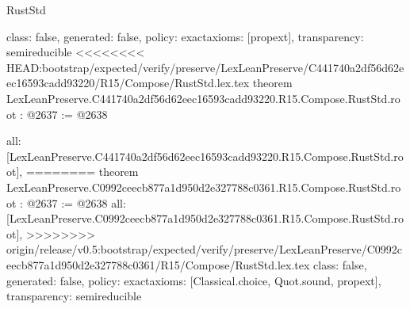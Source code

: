 \begin{lexlean}{RustStd}
\begin{coremodule}
{\begin{coremodule}
{{{{  class: false,
  generated: false,
  policy: exact{axioms: [propext]},
  transparency: semireducible
}
<<<<<<<< HEAD:bootstrap/expected/verify/preserve/LexLeanPreserve/C441740a2df56d62eec16593cadd93220/R15/Compose/RustStd.lex.tex
theorem LexLeanPreserve.C441740a2df56d62eec16593cadd93220.R15.Compose.RustStd.root : @2637 := @2638 {
  all: [LexLeanPreserve.C441740a2df56d62eec16593cadd93220.R15.Compose.RustStd.root],
========
theorem LexLeanPreserve.C0992ceecb877a1d950d2e327788c0361.R15.Compose.RustStd.root : @2637 := @2638 {
  all: [LexLeanPreserve.C0992ceecb877a1d950d2e327788c0361.R15.Compose.RustStd.root],
>>>>>>>> origin/release/v0.5:bootstrap/expected/verify/preserve/LexLeanPreserve/C0992ceecb877a1d950d2e327788c0361/R15/Compose/RustStd.lex.tex
  class: false,
  generated: false,
  policy: exact{axioms: [Classical.choice, Quot.sound, propext]},
  transparency: semireducible
}

}}}}
\end{coremodule}}
\end{coremodule}
\end{lexlean}

